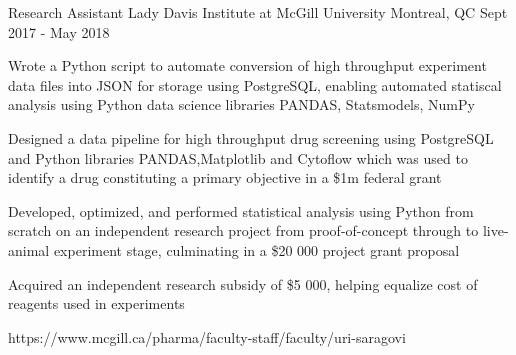 

\begin{cventries}
\cventrylink
{Research Assistant}
{Lady Davis Institute at McGill University}
{Montreal, QC}
{Sept 2017 - May 2018}
{ %
\begin{cvitems}
\item{Wrote a Python script to automate conversion of high throughput experiment data files into \textcolor{awesome-skyblue}{{JSON}} for storage using \newline \textcolor{awesome-skyblue} {PostgreSQL}, enabling automated statiscal analysis using Python data science libraries  \textcolor{awesome-skyblue}{PANDAS, Statsmodels, NumPy}}
\item{Designed a data pipeline for high throughput drug screening using PostgreSQL and Python libraries PANDAS,\newline  \textcolor{awesome-skyblue}{Matplotlib}} and   \textcolor{awesome-skyblue}{Cytoflow} which was used to identify a drug constituting a primary objective in a  \textcolor{awesome-skyblue}{\$1m federal grant}
\item{Developed, optimized, and performed statistical analysis using Python from scratch on an independent research project from proof-of-concept through to live-animal experiment stage, culminating in a \$20 000 project grant proposal}
\item{Acquired an independent research subsidy of \$5 000, helping equalize cost of reagents used in experiments}
\end{cvitems}
}
{https://www.mcgill.ca/pharma/faculty-staff/faculty/uri-saragovi}


\end{cventries}
